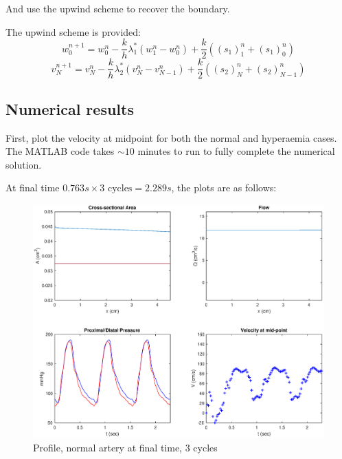 \documentclass[12pt]{article} %
\begin{document}
And use the upwind scheme to recover the boundary.

The upwind scheme is provided:
$$
	w_0^{n+1} = w_0^n - \frac{k}{h} \lambda_1^{*}(w_1^n - w_0^n) + \frac{k}{2} ((s_1)_1^n + (s_1)_0^n)
$$
$$
	v_N^{n+1} = v_{N}^n - \frac{k}{h} \lambda_2^{*}(v_N^{n} - v_{N-1}^{n}) + \frac{k}{2} ((s_2)_N^n + (s_2)_{N-1}^n)
$$

\subsection{Numerical results}
First, plot the velocity at midpoint for both the normal and hyperaemia cases. The MATLAB code takes $\sim 10$ minutes to run to fully complete the numerical solution.

At final time $0.763s \times 3 \text{ cycles} = 2.289 s$, the plots are as follows:
\begin{figure}[h!]
\caption{Profile, normal artery at final time, 3 cycles}
\centering
\includegraphics[width=1.0\textwidth]{normal4.eps}
\end{figure}
\end{document}

